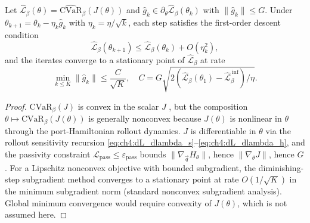 \begin{proposition}
\label{app:prop:cvar_descent}
Let $\hat{\mathcal{L}}_\beta(\theta)=\widehat{\mathrm{CVaR}}_\beta(J(\theta))$
and $\hat{g}_k\in\partial_\theta\hat{\mathcal{L}}_\beta(\theta_k)$
with $\|\hat{g}_k\|\leq G$.
Under $\theta_{k+1}=\theta_k-\eta_k\hat{g}_k$ with
$\eta_k=\eta/\sqrt{k}$, each step satisfies the first-order descent
condition
\[
  \hat{\mathcal{L}}_\beta(\theta_{k+1})
  \leq \hat{\mathcal{L}}_\beta(\theta_k) + O(\eta_k^2),
\]
and the iterates converge to a stationary point of
$\hat{\mathcal{L}}_\beta$ at rate
\[
  \min_{k\leq K}\|\hat{g}_k\| \leq \frac{C}{\sqrt{K}},
  \quad C = G\sqrt{2(\hat{\mathcal{L}}_\beta(\theta_1)-\hat{\mathcal{L}}_\beta^{\,\mathrm{inf}})/\eta}.
\]
\end{proposition}
\begin{proof}
$\mathrm{CVaR}_\beta(J)$ is convex in the scalar $J$
\citep{rockafellar2002cvar}, but the composition
$\theta\mapsto\mathrm{CVaR}_\beta(J(\theta))$ is generally nonconvex
because $J(\theta)$ is nonlinear in $\theta$ through the
port-Hamiltonian rollout dynamics.
$J$ is differentiable in $\theta$ via the rollout sensitivity
recursion \eqref{eq:ch4:dL_dlambda_s}--\eqref{eq:ch4:dL_dlambda_h},
and the passivity constraint $\mathcal{L}_{\mathrm{pass}}\leq
\varepsilon_{\mathrm{pass}}$ bounds $\|\nabla_{\vec{q}}H_\theta\|$,
hence $\|\nabla_\theta J\|$, hence $G$.
For a Lipschitz nonconvex objective with bounded subgradient,
the diminishing-step subgradient method converges to a stationary point
at rate $O(1/\sqrt{K})$ in the minimum subgradient norm
(standard nonconvex subgradient analysis).
Global minimum convergence would require convexity of $J(\theta)$,
which is not assumed here.
\end{proof}
